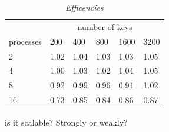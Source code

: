 \documentclass[a4paper,11pt,twoside]{article}
\begin{document}
\begin{table}[]
\centering
\caption{\textit{Efficencies}}
\label{tab:efficiencies}
\begin{tabular}{llllll}
\multicolumn{1}{l|}{}          & \multicolumn{5}{c}{number of keys}                                                                                \\ \cline{2-6} 
\multicolumn{1}{l|}{processes} & \multicolumn{1}{l|}{200} & \multicolumn{1}{l|}{400} & \multicolumn{1}{l|}{800} & \multicolumn{1}{l|}{1600} & 3200 \\ \hline
2                              & 1.02                     & 1.04                     & 1.03                     & 1.03                      & 1.05 \\
4                              & 1.00                     & 1.03                     & 1.02                     & 1.04                      & 1.05 \\
8                              & 0.92                     & 0.99                     & 0.96                     & 0.94                      & 1.02 \\
16                             & 0.73                     & 0.85                     & 0.84                     & 0.86                      & 0.87
\end{tabular}
\end{table}

is it scalable? Strongly or weakly?


\appendix
\end{document}
